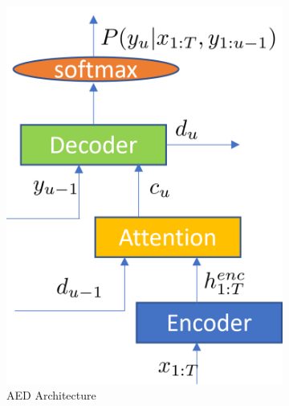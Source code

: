 \begin{figure}[h!]
\begin{subfigure}[b]{0.32\textwidth}
        \includegraphics[width=\linewidth]{obrazky-figures/archs/AED.png}
        \caption{AED Architecture}
        \label{fig:aed_arch}
    \end{subfigure}
    \hfill
    \begin{subfigure}[b]{0.38\textwidth} 
        \centering

\end{subfigure}
\end{figure}
